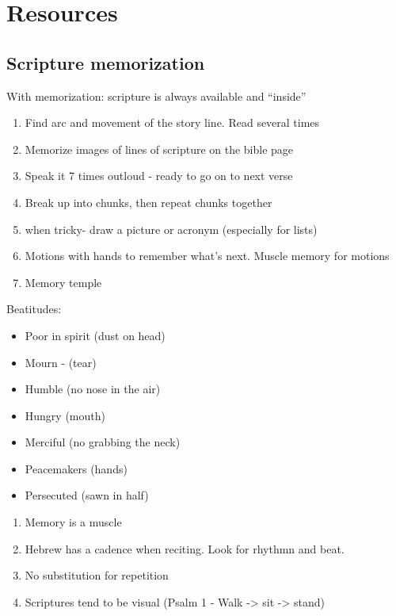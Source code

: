 \documentclass[
]{book}
\providecommand{\tightlist}{%
  \setlength{\itemsep}{0pt}\setlength{\parskip}{0pt}}
\begin{document}
\hypertarget{resources}{%
\chapter{Resources}\label{resources}}

\hypertarget{scripture-memorization}{%
\section{Scripture memorization}\label{scripture-memorization}}

With memorization: scripture is always available and ``inside''

\begin{enumerate}
\def\labelenumi{\arabic{enumi})}
\item
  Find arc and movement of the story line. Read several times
\item
  Memorize images of lines of scripture on the bible page
\item
  Speak it 7 times outloud - ready to go on to next verse
\item
  Break up into chunks, then repeat chunks together
\item
  when tricky- draw a picture or acronym (especially for lists)
\item
  Motions with hands to remember what's next. Muscle memory for motions
\item
  Memory temple
\end{enumerate}

Beatitudes:

\begin{itemize}
\tightlist
\item
  Poor in spirit (dust on head)
\item
  Mourn - (tear)
\item
  Humble (no nose in the air)
\item
  Hungry (mouth)
\item
  Merciful (no grabbing the neck)
\item
  Peacemakers (hands)
\item
  Persecuted (sawn in half)
\end{itemize}

\begin{enumerate}
\def\labelenumi{\arabic{enumi})}
\setcounter{enumi}{7}
\item
  Memory is a muscle
\item
  Hebrew has a cadence when reciting. Look for rhythmn and beat.
\item
  No substitution for repetition
\item
  Scriptures tend to be visual (Psalm 1 - Walk -\textgreater{} sit -\textgreater{} stand)
\end{enumerate}
\end{document}
